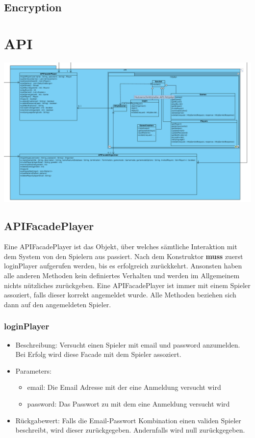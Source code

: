\documentclass[a4paper]{scrreprt}
\begin{document}
    \subsection{Encryption}

    \section{API}
    \includegraphics[width=\textwidth]{img/api.png}
    \subsection{APIFacadePlayer}
        Eine APIFacadePlayer ist das Objekt, über welches sämtliche Interaktion mit dem System von den Spielern aus passiert. Nach dem Konstruktor \textbf{muss} zuerst loginPlayer aufgerufen werden, bis es erfolgreich zurückkehrt. Ansonsten haben alle anderen Methoden kein definiertes Verhalten und werden im Allgemeinem nichts nützliches zurückgeben. Eine APIFacadePlayer ist immer mit einem Spieler assoziert, falls dieser korrekt angemeldet wurde. Alle Methoden beziehen sich dann auf den angemeldeten Spieler.
    \subsubsection{loginPlayer}
        \begin{itemize}
            \item Beschreibung: Versucht einen Spieler mit email und password anzumelden. Bei Erfolg wird diese Facade mit dem Spieler assoziert.
            \item Parameters: 
                \begin{itemize}
                    \item email: Die Email Adresse mit der eine Anmeldung versucht wird
                    \item password: Das Passwort zu mit dem eine Anmeldung versucht wird
                \end{itemize}
            \item Rückgabewert: Falls die Email-Passwort Kombination einen validen Spieler beschreibt, wird dieser zurückgegeben. Andernfalls wird null zurückgegeben.
        \end{itemize}
\end{document}

